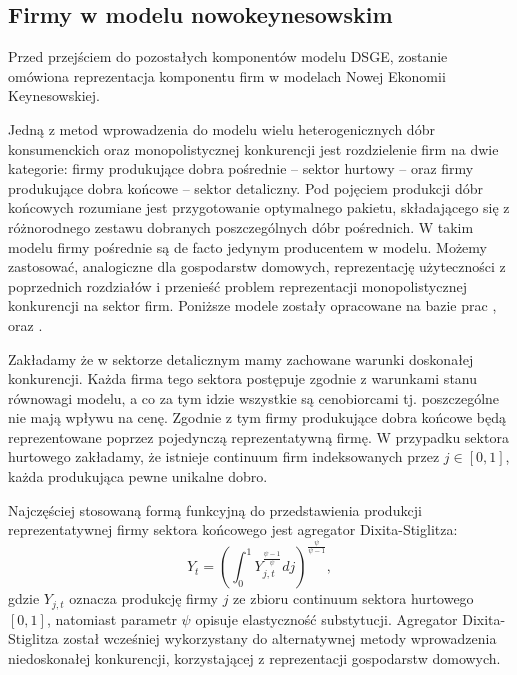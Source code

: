 \subsection{Firmy w modelu nowokeynesowskim}
\label{sec:firms_nek}

Przed przejściem do pozostałych komponentów modelu DSGE, zostanie omówiona reprezentacja komponentu firm w modelach Nowej Ekonomii Keynesowskiej.

Jedną z metod wprowadzenia do modelu wielu heterogenicznych dóbr konsumenckich oraz monopolistycznej konkurencji jest rozdzielenie firm na dwie kategorie: firmy produkujące dobra pośrednie -- sektor hurtowy -- oraz firmy produkujące dobra końcowe -- sektor detaliczny. Pod pojęciem produkcji dóbr końcowych rozumiane jest przygotowanie optymalnego pakietu, składającego się z różnorodnego zestawu dobranych poszczególnych dóbr pośrednich. W takim modelu firmy pośrednie są de facto jedynym producentem w modelu. Możemy zastosować, analogiczne dla gospodarstw domowych, reprezentację użyteczności z poprzednich rozdziałów i przenieść problem reprezentacji monopolistycznej konkurencji na sektor firm. Poniższe modele zostały opracowane na bazie prac \cite{nominal_rigidities}, \cite{gali_gov_spending} oraz \cite{costaBook}.

Zakładamy że w sektorze detalicznym mamy zachowane warunki doskonałej konkurencji. Każda firma tego sektora postępuje zgodnie z warunkami stanu równowagi modelu, a co za tym idzie wszystkie są cenobiorcami tj. poszczególne nie mają wpływu na cenę. Zgodnie z tym firmy produkujące dobra końcowe będą reprezentowane poprzez pojedynczą reprezentatywną firmę. W przypadku sektora hurtowego zakładamy, że istnieje continuum firm indeksowanych przez $j \in [0,1]$, każda produkująca pewne unikalne dobro. 

Najczęściej stosowaną formą funkcyjną do przedstawienia produkcji reprezentatywnej firmy sektora końcowego jest agregator Dixita-Stiglitza\cite{stiglitzCES}:
\begin{equation}
    \label{eqn:final_good_production}
    Y_t = \left(\int_0^1 Y_{j,t}^{\frac{\psi-1}{\psi}}dj\right)^{\frac{\psi}{\psi-1}},
\end{equation}
gdzie $Y_{j,t}$ oznacza produkcję firmy $j$ ze zbioru continuum sektora hurtowego $[0,1]$, natomiast parametr $\psi$ opisuje elastyczność substytucji. Agregator Dixita-Stiglitza został wcześniej wykorzystany do alternatywnej metody wprowadzenia niedoskonałej konkurencji, korzystającej z reprezentacji gospodarstw domowych.

